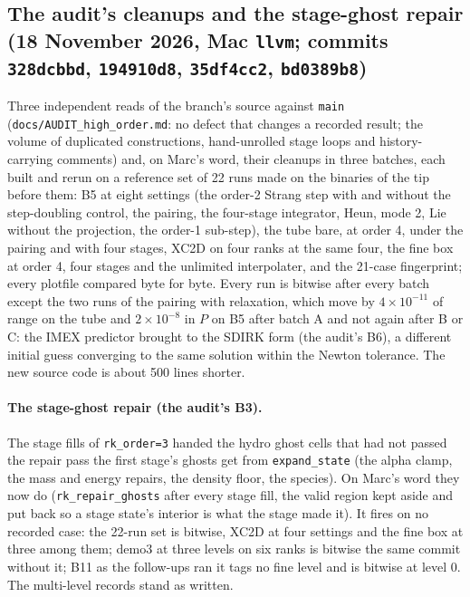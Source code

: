 \documentclass[11pt,a4paper]{article}
\newcommand{\code}[1]{\texttt{\small #1}}
\begin{document}
\subsection{The audit's cleanups and the stage-ghost repair (18 November 2026, Mac \code{llvm}; commits \code{328dcbbd}, \code{194910d8}, \code{35df4cc2}, \code{bd0389b8})}
\label{sec:audit}

Three independent reads of the branch's source against \code{main}
(\code{docs/AUDIT\_high\_order.md}: no defect that changes a recorded
result; the volume of duplicated constructions, hand-unrolled stage
loops and history-carrying comments) and, on Marc's word, their
cleanups in three batches, each built and rerun on a reference set of
22 runs made on the binaries of the tip before them: B5 at eight
settings (the order-2 Strang step with and without the step-doubling
control, the pairing, the four-stage integrator, Heun, mode 2, Lie
without the projection, the order-1 sub-step), the tube bare, at order
4, under the pairing and with four stages, XC2D on four ranks at the
same four, the fine box at order 4, four stages and the unlimited
interpolater, and the 21-case fingerprint; every plotfile compared byte
for byte.  Every run is bitwise after every batch except the two runs
of the pairing with relaxation, which move by $4\times10^{-11}$ of
range on the tube and $2\times10^{-8}$ in $P$ on B5 after batch A and
not again after B or C: the IMEX predictor brought to the SDIRK form
(the audit's B6), a different initial guess converging to the same
solution within the Newton tolerance.  The new source code is about
500 lines shorter.

\paragraph{The stage-ghost repair (the audit's B3).}  The stage fills of
\code{rk\_order=3} handed the hydro ghost cells that had not passed the
repair pass the first stage's ghosts get from \code{expand\_state} (the
alpha clamp, the mass and energy repairs, the density floor, the
species).  On Marc's word they now do (\code{rk\_repair\_ghosts} after
every stage fill, the valid region kept aside and put back so a stage
state's interior is what the stage made it).  It fires on no recorded
case: the 22-run set is bitwise, XC2D at four settings and the fine box
at three among them; demo3 at three levels on six ranks is bitwise the
same commit without it; B11 as the follow-ups ran it tags no fine level
and is bitwise at level 0.  The multi-level records stand as written.
\end{document}
